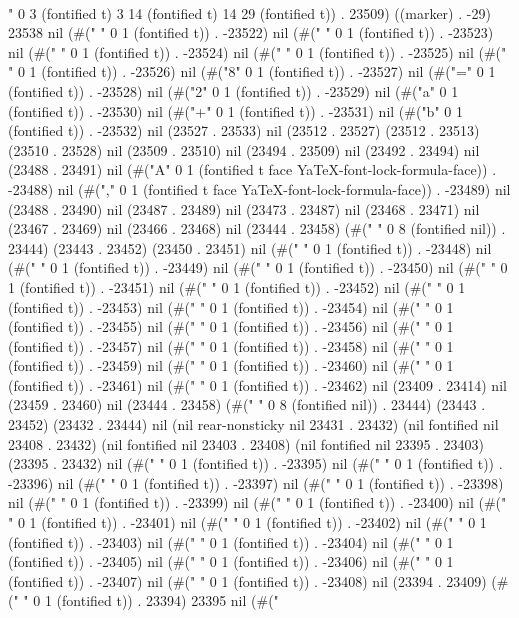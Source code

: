{              \\" 0 3 (fontified t) 3 14 (fontified t) 14 29 (fontified t)) . 23509) ((marker) . -29) 23538 nil (#(" " 0 1 (fontified t)) . -23522) nil (#(" " 0 1 (fontified t)) . -23523) nil (#(" " 0 1 (fontified t)) . -23524) nil (#(" " 0 1 (fontified t)) . -23525) nil (#(" " 0 1 (fontified t)) . -23526) nil (#("8" 0 1 (fontified t)) . -23527) nil (#("=" 0 1 (fontified t)) . -23528) nil (#("2" 0 1 (fontified t)) . -23529) nil (#("a" 0 1 (fontified t)) . -23530) nil (#("+" 0 1 (fontified t)) . -23531) nil (#("b" 0 1 (fontified t)) . -23532) nil (23527 . 23533) nil (23512 . 23527) (23512 . 23513) (23510 . 23528) nil (23509 . 23510) nil (23494 . 23509) nil (23492 . 23494) nil (23488 . 23491) nil (#("A" 0 1 (fontified t face YaTeX-font-lock-formula-face)) . -23488) nil (#("," 0 1 (fontified t face YaTeX-font-lock-formula-face)) . -23489) nil (23488 . 23490) nil (23487 . 23489) nil (23473 . 23487) nil (23468 . 23471) nil (23467 . 23469) nil (23466 . 23468) nil (23444 . 23458) (#("        " 0 8 (fontified nil)) . 23444) (23443 . 23452) (23450 . 23451) nil (#("
" 0 1 (fontified t)) . -23448) nil (#(" " 0 1 (fontified t)) . -23449) nil (#(" " 0 1 (fontified t)) . -23450) nil (#(" " 0 1 (fontified t)) . -23451) nil (#(" " 0 1 (fontified t)) . -23452) nil (#(" " 0 1 (fontified t)) . -23453) nil (#(" " 0 1 (fontified t)) . -23454) nil (#(" " 0 1 (fontified t)) . -23455) nil (#(" " 0 1 (fontified t)) . -23456) nil (#(" " 0 1 (fontified t)) . -23457) nil (#(" " 0 1 (fontified t)) . -23458) nil (#(" " 0 1 (fontified t)) . -23459) nil (#(" " 0 1 (fontified t)) . -23460) nil (#(" " 0 1 (fontified t)) . -23461) nil (#(" " 0 1 (fontified t)) . -23462) nil (23409 . 23414) nil (23459 . 23460) nil (23444 . 23458) (#("        " 0 8 (fontified nil)) . 23444) (23443 . 23452) (23432 . 23444) nil (nil rear-nonsticky nil 23431 . 23432) (nil fontified nil 23408 . 23432) (nil fontified nil 23403 . 23408) (nil fontified nil 23395 . 23403) (23395 . 23432) nil (#(" " 0 1 (fontified t)) . -23395) nil (#(" " 0 1 (fontified t)) . -23396) nil (#(" " 0 1 (fontified t)) . -23397) nil (#(" " 0 1 (fontified t)) . -23398) nil (#(" " 0 1 (fontified t)) . -23399) nil (#(" " 0 1 (fontified t)) . -23400) nil (#(" " 0 1 (fontified t)) . -23401) nil (#(" " 0 1 (fontified t)) . -23402) nil (#(" " 0 1 (fontified t)) . -23403) nil (#(" " 0 1 (fontified t)) . -23404) nil (#(" " 0 1 (fontified t)) . -23405) nil (#(" " 0 1 (fontified t)) . -23406) nil (#(" " 0 1 (fontified t)) . -23407) nil (#(" " 0 1 (fontified t)) . -23408) nil (23394 . 23409) (#(" " 0 1 (fontified t)) . 23394) 23395 nil (#("
}
